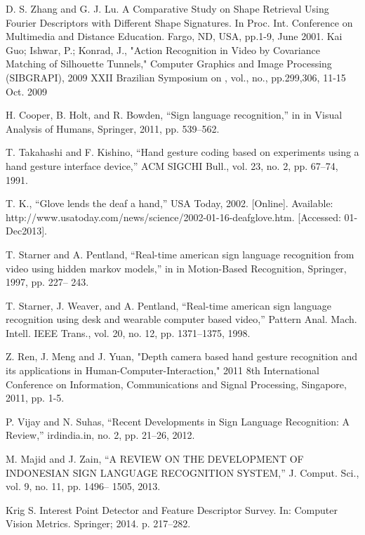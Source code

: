 \documentclass[12pt]{report}           %
\begin{document}
\begin{thebibliography}{80}


D. S. Zhang and G. J. Lu. A Comparative Study on Shape Retrieval
Using Fourier Descriptors with Different Shape Signatures. In Proc. Int.
Conference on Multimedia and Distance Education. Fargo, ND, USA,
pp.1-9, June 2001. 
Kai Guo; Ishwar, P.; Konrad, J., "Action Recognition in Video by Covariance
Matching of Silhouette Tunnels," Computer Graphics and Image Processing
(SIBGRAPI), 2009 XXII Brazilian Symposium on , vol., no., pp.299,306, 11-15 Oct.
2009 


 H. Cooper, B. Holt, and R. Bowden, “Sign language recognition,” in in Visual Analysis of
Humans, Springer, 2011, pp. 539–562. 



 T. Takahashi and F. Kishino, “Hand gesture coding based on experiments using a hand
gesture interface device,” ACM SIGCHI Bull., vol. 23, no. 2, pp. 67–74, 1991. 



T. K., “Glove lends the deaf a hand,” USA Today, 2002. [Online]. Available:
http://www.usatoday.com/news/science/2002-01-16-deafglove.htm. [Accessed: 01-Dec2013].

 T. Starner and A. Pentland, “Real-time american sign language recognition from video
using hidden markov models,” in in Motion-Based Recognition, Springer, 1997, pp. 227–
243. 

 T. Starner, J. Weaver, and A. Pentland, “Real-time american sign language recognition
using desk and wearable computer based video,” Pattern Anal. Mach. Intell. IEEE Trans.,
vol. 20, no. 12, pp. 1371–1375, 1998. 

Z. Ren, J. Meng and J. Yuan, "Depth camera based hand gesture recognition and its applications in Human-Computer-Interaction," 2011 8th International Conference on Information, Communications and Signal Processing, Singapore, 2011, pp. 1-5.

 P. Vijay and N. Suhas, “Recent Developments in Sign Language Recognition: A Review,”
irdindia.in, no. 2, pp. 21–26, 2012. 
 
M. Majid and J. Zain, “A REVIEW ON THE DEVELOPMENT OF INDONESIAN SIGN
LANGUAGE RECOGNITION SYSTEM,” J. Comput. Sci., vol. 9, no. 11, pp. 1496–
1505, 2013. 

Krig S. Interest Point Detector and Feature Descriptor Survey. In: Computer Vision Metrics. Springer; 2014. p. 217–282.




\end{thebibliography}
\end{document}
